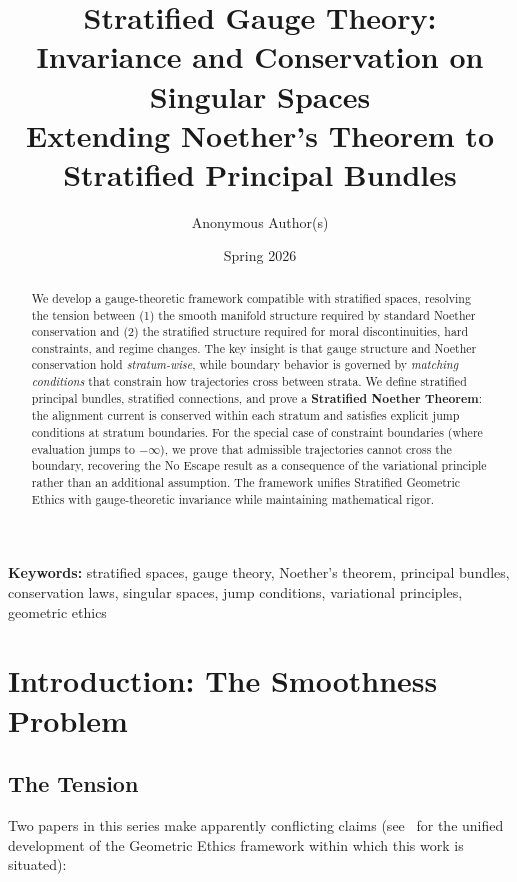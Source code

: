 \documentclass[11pt,a4paper]{article}
\title{\textbf{Stratified Gauge Theory:\\Invariance and Conservation on Singular Spaces}\\[0.5em]
\large Extending Noether's Theorem to Stratified Principal Bundles}
\author{Anonymous Author(s)}
\date{Spring 2026}
\begin{document}
\maketitle

\begin{abstract}
We develop a gauge-theoretic framework compatible with stratified spaces, resolving the
tension between (1) the smooth manifold structure required by standard Noether conservation and (2) the stratified structure required for moral discontinuities, hard constraints,
and regime changes. The key insight is that gauge structure and Noether conservation hold
\textit{stratum-wise}, while boundary behavior is governed by \textit{matching conditions} that constrain
how trajectories cross between strata. We define stratified principal bundles, stratified
connections, and prove a \textbf{Stratified Noether Theorem}: the alignment current is conserved within each stratum and satisfies explicit jump conditions at stratum boundaries.
For the special case of constraint boundaries (where evaluation jumps to $-\infty$), we prove
that admissible trajectories cannot cross the boundary, recovering the No Escape result as a
consequence of the variational principle rather than an additional assumption. The framework unifies Stratified Geometric Ethics with gauge-theoretic invariance while maintaining
mathematical rigor.
\end{abstract}

\medskip
\noindent\textbf{Keywords:} stratified spaces, gauge theory, Noether's theorem, principal bundles, conservation laws, singular spaces, jump conditions, variational principles, geometric ethics

\tableofcontents

\section{Introduction: The Smoothness Problem}

\subsection{The Tension}

Two papers in this series make apparently conflicting claims (see~\cite{bond2026ge} for the unified development of the Geometric Ethics framework within which this work is situated):
\end{document}
